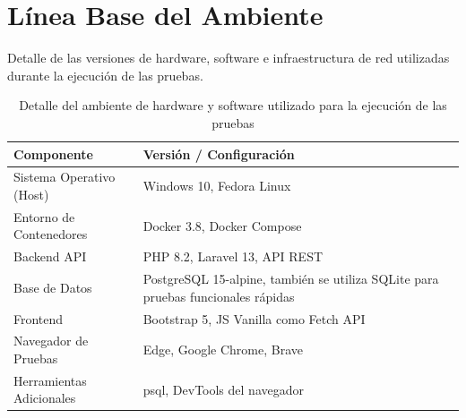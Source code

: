 \section{Línea Base del Ambiente}
\label{sec:linea_base_ambiente}

Detalle de las versiones de hardware, software e infraestructura de red utilizadas durante la ejecución de las pruebas.

\begin{table}[H]
    \centering
    \caption{Detalle del ambiente de hardware y software utilizado para la ejecución de las pruebas}
    \label{tab:detalle_ambiente}
    \begin{tabularx}{\textwidth}{l X}
        \toprule
        \textbf{Componente} & \textbf{Versión / Configuración} \\
        \midrule
        Sistema Operativo (Host) & Windows 10, Fedora Linux \\
        Entorno de Contenedores & Docker 3.8, Docker Compose \\
        Backend API & PHP 8.2, Laravel 13, API REST \\
        Base de Datos & PostgreSQL 15-alpine, también se utiliza SQLite para pruebas funcionales rápidas \\
        Frontend & Bootstrap 5, JS Vanilla como Fetch API \\
        Navegador de Pruebas & Edge, Google Chrome, Brave \\
        Herramientas Adicionales & psql, DevTools del navegador \\
        \bottomrule
    \end{tabularx}
\end{table}